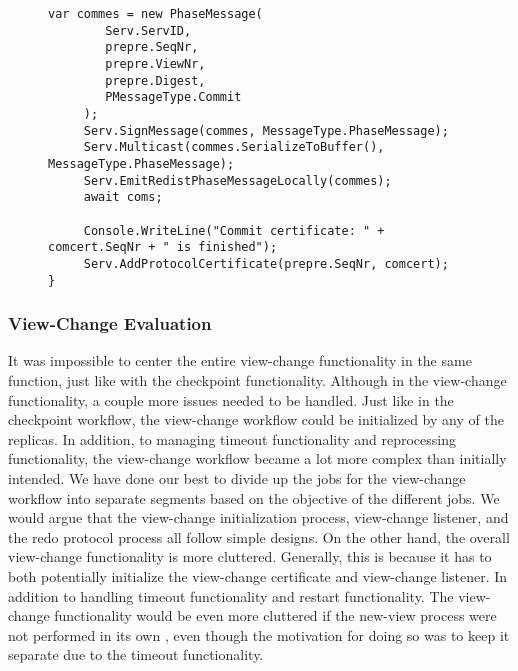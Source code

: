 \begin{figure}[H]
\begin{lstlisting}[label = code:redoprotocol, caption=Redo Protocol Functionality, captionpos = b, basicstyle=\scriptsize]
     var commes = new PhaseMessage(
        Serv.ServID, 
        prepre.SeqNr, 
        prepre.ViewNr, 
        prepre.Digest, 
        PMessageType.Commit
     );
     Serv.SignMessage(commes, MessageType.PhaseMessage);
     Serv.Multicast(commes.SerializeToBuffer(), MessageType.PhaseMessage);
     Serv.EmitRedistPhaseMessageLocally(commes);
     await coms;
     
     Console.WriteLine("Commit certificate: " + comcert.SeqNr + " is finished");
     Serv.AddProtocolCertificate(prepre.SeqNr, comcert);
}
	\end{lstlisting}
\end{figure}

\subsubsection{View-Change Evaluation}
It was impossible to center the entire view-change functionality in the same function, just like with the checkpoint functionality. Although in the view-change functionality, a couple more issues needed to be handled. Just like in the checkpoint workflow, the view-change workflow could be initialized by any of the replicas. In addition, to managing timeout functionality and reprocessing functionality, the view-change workflow became a lot more complex than initially intended. We have done our best to divide up the jobs for the view-change workflow into separate segments based on the objective of the different jobs.  We would argue that the view-change initialization process, view-change listener, and the redo protocol process all follow simple designs.
On the other hand, the overall view-change functionality is more cluttered.  Generally, this is because it has to both potentially initialize the view-change certificate and view-change listener. In addition to handling timeout functionality and restart functionality. The view-change functionality would be even more cluttered if the new-view process were not performed in its own , even though the motivation for doing so was to keep it separate due to the timeout functionality. 

